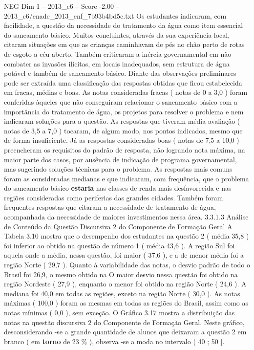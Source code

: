 \begin{textsample}{NEG Dim 1 – 2013\_c6 – Score -2.00 – 2013\_c6/enade\_2013\_enf\_7b93b4bd5c.txt}
Os estudantes indicaram, com facilidade, a questão da necessidade do tratamento da água como item essencial do saneamento básico.
Muitos concluintes, através da sua experiência local, citaram situações em que as crianças caminhavam de pés no chão perto de rotas de esgoto a céu aberto.
Também criticaram a inércia governamental em não combater as invasões ilícitas, em locais inadequados, sem estrutura de água potável e também de saneamento básico.
Diante das observações preliminares pode ser extraída uma classificação das respostas obtidas que ficou estabelecida em fracas, médias e boas.
As notas consideradas fracas ( notas de 0 a 3,0 ) foram conferidas àqueles que não conseguiram relacionar o saneamento básico com a importância do tratamento de água, os projetos para resolver o problema e nem indicaram soluções para a questão.
As respostas que tiveram média avaliação ( notas de 3,5 a 7,0 ) tocaram, de algum modo, nos pontos indicados, mesmo que de forma insuficiente.
Já as respostas consideradas boas ( notas de 7,5 a 10,0 ) preencheram os requisitos do padrão de resposta, não logrando nota máxima, na maior parte dos casos, por ausência de indicação de programa governamental, mas sugerindo soluções técnicas para o problema.
As respostas mais comuns foram as consideradas medianas e que indicaram, com frequência, que o problema do saneamento básico \textbf{estaria} nas classes de renda mais desfavorecida e nas regiões consideradas como periferias das grandes cidades.
Também foram frequentes respostas que citaram a necessidade de tratamento de água, acompanhada da necessidade de maiores investimentos nessa área. 3.3.1.3 Análise de Conteúdo da Questão Discursiva 2 do Componente de Formação Geral A Tabela 3.10 mostra que o desempenho dos estudantes na questão 2 ( média 35,8 ) foi inferior ao obtido na questão de número 1 ( média 43,6 ).
A região Sul foi aquela onde a média, nessa questão, foi maior ( 37,6 ), e a de menor média foi a região Norte ( 29,7 ).
Quanto à variabilidade das notas, o desvio padrão de todo o Brasil foi 26,9, o mesmo obtido na O maior desvio nessa questão foi obtido na região Nordeste ( 27,9 ), enquanto o menor foi obtido na região Norte ( 24,6 ).
A mediana foi 40,0 em todas as regiões, exceto na região Norte ( 30,0 ).
As notas máximas ( 100,0 ) foram as mesmas em todas as regiões do Brasil, assim como as notas mínimas ( 0,0 ), sem exceção.
O Gráfico 3.17 mostra a distribuição das notas na questão discursiva 2 do Componente de Formação Geral.
Neste gráfico, desconsiderando -se a grande quantidade de alunos que deixaram a questão 2 em branco ( em \textbf{torno} de 23 \% ), observa -se a moda no intervalo ( 40 ; 50 ].

\end{textsample}

